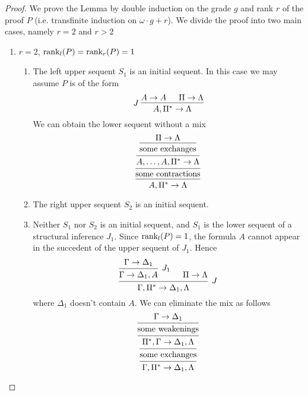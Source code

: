\documentclass[11pt]{article}
\begin{document}
\begin{proof}
We prove the Lemma by double induction on the grade \(g\) and rank \(r\) of
the proof \(P\) (i.e. transfinite induction on \(\omega\cdot g+r\)). We
divide the proof into two main cases, namely \(r=2\) and \(r>2\)

\begin{enumerate}
\item \(r=2\), \(\text{rank}_l(P)=\text{rank}_r(P)=1\)
\begin{enumerate}
\item The left upper sequent \(S_1\) is an initial sequent. In this case we
may assume \(P\) is of the form
\begin{equation*}
J\;\begin{prooftree}%
\hypo{A\to A}
\hypo{\Pi\to \Lambda}
\infer2{A,\Pi^*\to\Lambda}
\end{prooftree}
\end{equation*}
We can obtain the lower sequent without a mix
\begin{equation*}
\begin{prooftree}%
\hypo{\Pi\to\Lambda}
\infer1{\text{some exchanges}}
\infer1{A,\dots,A,\Pi^*\to\Lambda}
\infer1{\text{some contractions}}
\infer1{A,\Pi^*\to\Lambda}
\end{prooftree}
\end{equation*}
\item The right upper sequent \(S_2\) is an initial sequent.
\item Neither \(S_1\) nor \(S_2\) is an initial sequent, and \(S_1\) is the
lower sequent of a structural inference \(J_1\). Since
\(\text{rank}_l(P)=1\), the formula \(A\) cannot appear in the succedent of
the upper sequent of \(J_1\). Hence
\begin{equation*}
\begin{prooftree}%
\hypo{\Gamma\to\Delta_1}
\infer1[\(J_1\)]{\Gamma\to\Delta_1,A}
\hypo{\Pi\to\Lambda}
\infer2[\(J\)]{\Gamma,\Pi^*\to\Delta_1,\Lambda}
\end{prooftree}
\end{equation*}
where \(\Delta_1\) doesn't contain \(A\). We can eliminate the mix as
follows
\begin{equation*}
\begin{prooftree}%
\hypo{\Gamma\to\Delta_1}
\infer1{\text{some weakenings}}
\infer1{\Pi^*,\Gamma\to\Delta_1,\Lambda}
\infer1{\text{some exchanges}}
\infer1{\Gamma,\Pi^*\to\Delta_1,\Lambda}
\end{prooftree}
\end{equation*}

\end{enumerate}
\end{enumerate}
\end{proof}
\end{document}
